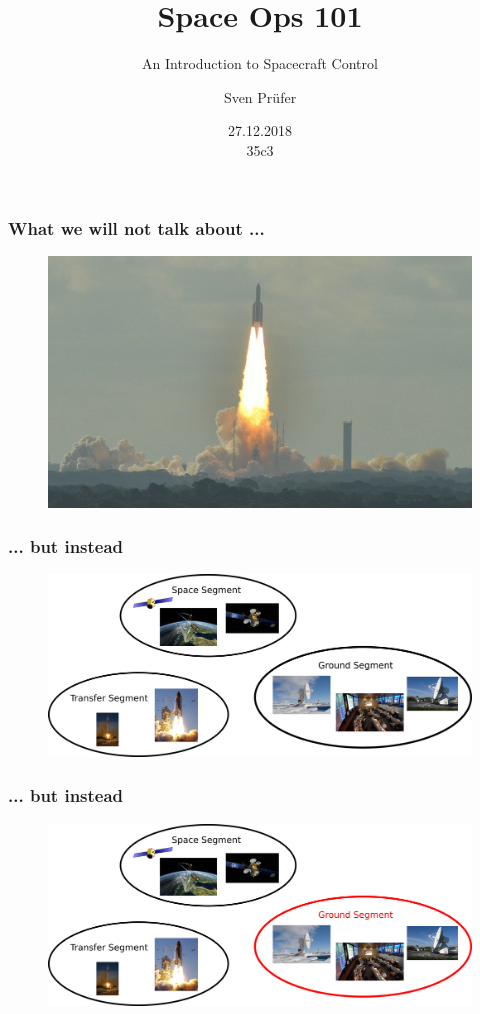 \documentclass[12pt,utf8,notheorems,compress]{beamer}
\title{Space Ops 101}
\subtitle{An Introduction to Spacecraft Control}
\author{Sven Prüfer}
\institute{German Space Operations Center}
\date{27.12.2018\\[0.5cm]
35c3}
\begin{document}
\begin{frame}
 \titlepage
\end{frame}

\begin{frame}
  \frametitle{What we will not talk about ...}
  \begin{figure}[!ht]
    \centering
    \includegraphics[width=\textwidth]{rocket-launch.jpg}
  \end{figure}
\end{frame}

\begin{frame}
  \frametitle{... but instead}
    \begin{figure}[!ht]
    \centering
    \includegraphics[width=1\textwidth]{segments.png}
  \end{figure}
\end{frame}

\begin{frame}
  \frametitle{... but instead}
    \begin{figure}[!ht]
    \centering
    \includegraphics[width=1\textwidth]{segments-red.png}
  \end{figure}
\end{frame}
\end{document}
